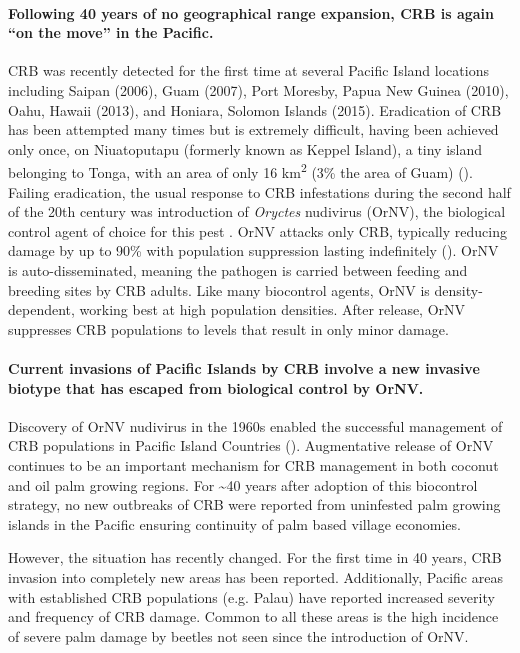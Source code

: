 \documentclass[12pt,letterpaper,english,bibliography=totocnumbered, abstract=on]{scrartcl}
\begin{document}
\paragraph{Following 40 years of no geographical range expansion, CRB is again
``on the move'' in the Pacific.}

CRB was recently detected for the first time at several Pacific Island
locations including Saipan (2006), Guam (2007), Port Moresby, Papua
New Guinea (2010), Oahu, Hawaii (2013), and Honiara, Solomon Islands
(2015). Eradication of CRB has been attempted many times but is extremely
difficult, having been achieved only once, on Niuatoputapu (formerly
known as Keppel Island), a tiny island belonging to Tonga, with an
area of only 16 km\textsuperscript{2} (3\% the area of Guam) (\cite{catley_coconut_1969}).
Failing eradication, the usual response to CRB infestations during
the second half of the 20th century was introduction of \emph{Oryctes}
nudivirus (OrNV), the biological control agent of choice for this
pest \cite{jackson_use_2009-1} . OrNV attacks only CRB, typically
reducing damage by up to 90\% with population suppression lasting
indefinitely (\cite{bedford_g._o._long-term_2013}). OrNV is auto-disseminated,
meaning the pathogen is carried between feeding and breeding sites
by CRB adults. Like many biocontrol agents, OrNV is density-dependent,
working best at high population densities. After release, OrNV suppresses
CRB populations to levels that result in only minor damage. 

\paragraph*{Current invasions of Pacific Islands by CRB involve a new invasive
biotype that has escaped from biological control by OrNV. }

Discovery of OrNV nudivirus in the 1960s enabled the successful management
of CRB populations in Pacific Island Countries (\cite{huger_oryctes_2005-1}).
Augmentative release of OrNV continues to be an important mechanism
for CRB management in both coconut and oil palm growing regions. For
\textasciitilde{}40 years after adoption of this biocontrol strategy,
no new outbreaks of CRB were reported from uninfested palm growing
islands in the Pacific ensuring continuity of palm based village economies. 

However, the situation has recently changed. For the first time in
40 years, CRB invasion into completely new areas has been reported.
Additionally, Pacific areas with established CRB populations (e.g.
Palau) have reported increased severity and frequency of CRB damage.
Common to all these areas is the high incidence of severe palm damage
by beetles not seen since the introduction of OrNV. 
\end{document}
